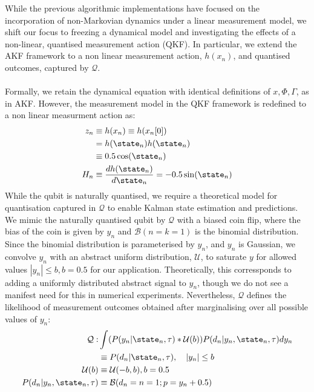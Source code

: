 While the previous algorithmic implementations have focused on the incorporation of non-Markovian dynamics under a linear measurement model, we shift our focus to freezing a dynamical model and investigating the effects of a non-linear, quantised measurement action (QKF). In particular, we extend the AKF framework to a non linear measurement action, $h(x_n)$, and quantised outcomes, captured by $\mathcal{Q}$. 
\\
\\
Formally, we retain the dynamical equation with identical definitions of $x, \Phi, \Gamma$, as in AKF.  However, the measurement model in the QKF framework is redefined to a non linear measurment action as:
\begin{align}
z_n & \equiv  h(x_n) \equiv h(x_n[0]) \\
& = h(\state_n)h(\state_n) \\
& \equiv  0.5\cos(\state_{n}) \\
H_n &\equiv \frac{d h(\state_n)}{d\state_n} =  -0.5\sin(\state_{n})
\end{align}
While the qubit is naturally quantised, we require a theoretical model for quantisation captured in $\mathcal{Q}$ to enable Kalman state estimation and predictions. We mimic the naturally quantised qubit by $\mathcal{Q}$ with a biased coin flip, where the bias of the coin is given by $y_n$ and $\mathcal{B}(n=k=1)$ is the binomial distribution. Since the binomial distribution is parameterised by $y_n$, and $y_n$ is Gaussian, we convolve $y_n$ with an abstract uniform distribution, $\mathcal{U}$, to saturate $y$ for allowed values $|y_n| \leq b, b = 0.5$ for our application. Theoretically, this corressponds to adding a uniformly distributed abstract signal to $y_n$, though we do not see a manifest need for this in numerical experiments. Nevertheless,  $\mathcal{Q}$ defines the likelihood of measurement outcomes obtained after marginalising over all possible values of $y_n$:
\begin{align}
\mathcal{Q}: & \int (P(y_n | \state_{n}, \tau) * \mathcal{U}(b) ) P(d_n | y_n, \state_{n}, \tau) dy_n \\
& \equiv P(d_n | \state_{n}, \tau), \quad |y_n| \leq b\\
\mathcal{U}(b) & \equiv \mathcal{U}(-b, b), b = 0.5 \\
P(d_n | y_n, \state_{n}, \tau) & \equiv \mathcal{B}(d_n=n=1;p= y_n + 0.5 )
\end{align}
